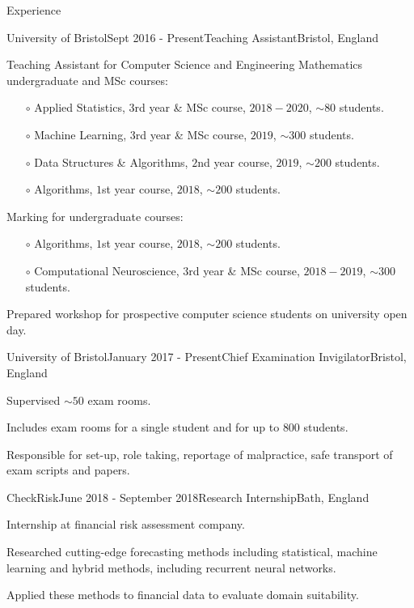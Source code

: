 \documentclass{resume} %
\begin{document}
\begin{rSection}{Experience}

  \begin{rSubsection}{University of Bristol}{Sept 2016 - Present}{Teaching Assistant}{Bristol, England}
    \item Teaching Assistant for Computer Science and Engineering Mathematics undergraduate and MSc courses:
      \begin{itemize}
        \item[$\circ$] Applied Statistics, $3$rd year \&  MSc course, $2018 - 2020$, $\sim 80$ students.
        \item[$\circ$] Machine Learning, $3$rd year \& MSc course, $2019$, $\sim 300$ students.
        \item[$\circ$] Data Structures \& Algorithms, $2$nd year course, $2019$, $\sim 200$ students.
        \item[$\circ$] Algorithms, $1$st year course, $2018$, $\sim 200$ students.
      \end{itemize}\vspace{1.5mm}
    \item Marking for undergraduate courses:
      \begin{itemize}
        \item[$\circ$] Algorithms, $1$st year course, $2018$, $\sim 200$ students.
        \item[$\circ$] Computational Neuroscience, $3$rd year \& MSc course, $2018-2019$, $\sim 300$ students.
      \end{itemize}\vspace{1.5mm}
    \item Prepared workshop for prospective computer science students on university open day.
  \end{rSubsection}

\newpage

  \begin{rSubsection}{University of Bristol}{January 2017 - Present}{Chief Examination Invigilator}{Bristol, England}
    \item Supervised $\sim 50$ exam rooms.
    \item Includes exam rooms for a single student and for up to $800$ students.
    \item Responsible for set-up, role taking, reportage of malpractice, safe transport of exam scripts and papers.
  \end{rSubsection}

  \begin{rSubsection}{CheckRisk}{June 2018 - September 2018}{Research Internship}{Bath, England}
    \item Internship at financial risk assessment company.
    \item Researched cutting-edge forecasting methods including statistical, machine learning and hybrid methods, including recurrent neural networks.
    \item Applied these methods to financial data to evaluate domain suitability.
  \end{rSubsection}


\end{rSection}
\end{document}
